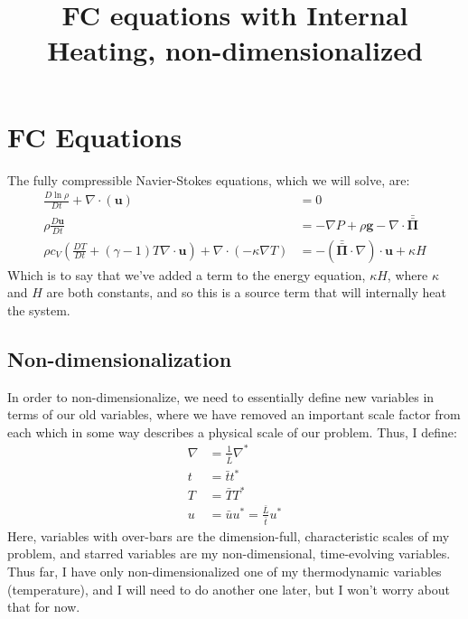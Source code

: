 \documentclass[aps, pre, onecolumn, nofootinbib, notitlepage, groupedaddress, amsfonts, amssymb, amsmath, longbibliography]{revtex4-1}
\newcommand{\grad}{\ensuremath{\nabla}}
\newcommand{\stressT}{\ensuremath{\bm{\bar{\bar{\Pi}}}}}
\begin{document}
\title{FC equations with Internal Heating, non-dimensionalized}

\maketitle

\section{FC Equations}
The fully compressible Navier-Stokes equations, which we will solve, are:
\begin{equation}
\begin{split}
\frac{D \ln \rho}{D t} + \grad\cdot(\bm{u}) &= 0 \\
\rho\frac{D \bm{u}}{D t} &= -\grad P + \rho \bm{g} - \grad\cdot\stressT \\
\rho c_V \left(\frac{D T}{D t} + (\gamma - 1)T\grad\cdot\bm{u}\right) + 
\grad\cdot ( - \kappa \grad T) &= - (\stressT \cdot \grad) \cdot \bm{u} + \kappa H
\end{split}
\end{equation}
Which is to say that we've added a term to the energy equation, $\kappa H$, where
$\kappa$ and $H$ are both constants, and so this is a source term that will internally
heat the system.

\subsection{Non-dimensionalization}
In order to non-dimensionalize, we need to essentially define new variables in
terms of our old variables, where we have removed an important scale factor from
each which in some way describes a physical scale of our problem.
Thus, I define:
\begin{equation}
\begin{split}
\grad &= \frac{1}{\bar{L}}\grad^* \\
t &= \bar{t} t^* \\
T &= \bar{T} T^* \\
u &= \bar{u} u^* = \frac{\bar{L}}{\bar{t}} u^*
\end{split}
\end{equation}
Here, variables with over-bars are the dimension-full, characteristic scales of my problem,
and starred variables are my non-dimensional, time-evolving variables.
Thus far, I have only non-dimensionalized one of my thermodynamic variables (temperature),
and I will need to do another one later, but I won't worry about that for now.
\end{document}

